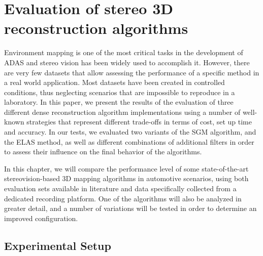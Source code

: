 
\graphicspath{{./images/chapter03/bmps/}{./images/chapter03/vects/}{./images/chapter03/}}

\chapter{Evaluation of stereo 3D reconstruction algorithms}\label{ch:chapter03}

Environment mapping is one of the most critical tasks in the development of \ac{ADAS} and stereo vision has been widely used to accomplish it. However, there are very few datasets that allow assessing the performance of a specific method in a real world application. Most datasets have been created in controlled conditions, thus neglecting scenarios that are impossible to reproduce in a laboratory. In this paper, we present the results of the evaluation of three different dense reconstruction algorithm implementations using a number of well-known strategies that represent different trade-offs in terms of cost, set up time and accuracy. In our tests, we evaluated two variants of the \acf{SGM} algorithm, and the \acf{ELAS} method, as well as different combinations of additional filters in order to assess their influence on the final behavior of the algorithms.

In this chapter, we will compare the performance level of some state-of-the-art stereovision-based 3D mapping algorithms in automotive scenarios, using both evaluation sets available in literature and data specifically collected from a dedicated recording platform. One of the algorithms will also be analyzed in greater detail, and a number of variations will be tested in order to determine an improved configuration.

\section{Experimental Setup}\label{ch:chapter03_01}

